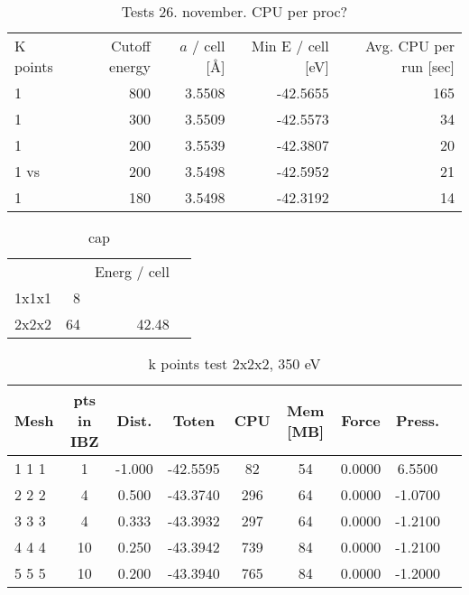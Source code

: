 \documentclass[11pt,bibliography=totoc,index=totoc]{scrbook}   %
\begin{document}
\begin{table}[htbp]
  \centering
  \begin{tabular}{lrrrr}
    K points    & Cutoff energy & $a$ / cell [\AA]   & Min E / cell [eV] & Avg. CPU per run [sec]      \\
    1           & 800           & 3.5508             & -42.5655          & 165      \\
    1           & 300           & 3.5509             & -42.5573          & 34       \\
    1           & 200           & 3.5539             & -42.3807          & 20       \\
    1 vs        & 200           & 3.5498             & -42.5952          & 21       \\
    1           & 180           & 3.5498             & -42.3192          & 14       \\
  \end{tabular}
  \caption{Tests 26. november. CPU per proc?}
\end{table}


\begin{table}[htbp]
  \centering
  \begin{tabular}{lrrr}
          &     & Energ / cell  \\
    1x1x1 &   8 &               \\
    2x2x2 &  64 & 42.48         \\
  \end{tabular}
  \caption{cap}
  \label{tab:supertests}
\end{table}


\begin{table}[htbp]
  \centering
  \begin{tabular}{lcccccccc}\toprule
    Mesh	& pts in IBZ    & Dist. & Toten     & CPU	& Mem [MB]  & Force	    & Press.	 \\\midrule
    1 1 1	&  1    	    &-1.000	& -42.5595	& 82	& 54        & 0.0000	& 6.5500	 \\
    2 2 2	&  4    	    & 0.500	& -43.3740	& 296	& 64        & 0.0000	& -1.0700	 \\
    3 3 3	&  4    	    & 0.333	& -43.3932	& 297   & 64        & 0.0000	& -1.2100	 \\
    4 4 4	& 10    	    & 0.250	& -43.3942	& 739	& 84        & 0.0000	& -1.2100	 \\
    5 5 5	& 10	        & 0.200	& -43.3940	& 765	& 84        & 0.0000	& -1.2000	 \\\bottomrule
  \end{tabular}
  \caption{k points test 2x2x2, 350 eV}
  \label{tab:ktest2}
\end{table}
\end{document}
